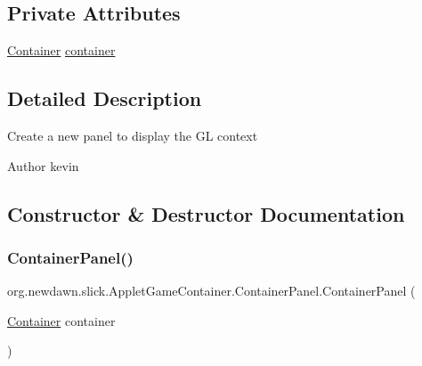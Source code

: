 \subsection*{Private Attributes}
\begin{DoxyCompactItemize}
\item 
\mbox{\hyperlink{classorg_1_1newdawn_1_1slick_1_1_applet_game_container_1_1_container}{Container}} \mbox{\hyperlink{classorg_1_1newdawn_1_1slick_1_1_applet_game_container_1_1_container_panel_a205433c30651024b8b0ba19894a080f6}{container}}
\end{DoxyCompactItemize}


\subsection{Detailed Description}
Create a new panel to display the GL context

\begin{DoxyAuthor}{Author}
kevin 
\end{DoxyAuthor}


\subsection{Constructor \& Destructor Documentation}
\mbox{\label{classorg_1_1newdawn_1_1slick_1_1_applet_game_container_1_1_container_panel_a71e98bdd07081b033755c98b0183c7f4}} 
\subsubsection{\texorpdfstring{Container\+Panel()}{ContainerPanel()}}
{\footnotesize\ttfamily org.\+newdawn.\+slick.\+Applet\+Game\+Container.\+Container\+Panel.\+Container\+Panel (\begin{DoxyParamCaption}\item[{\mbox{\hyperlink{classorg_1_1newdawn_1_1slick_1_1_applet_game_container_1_1_container}{Container}}}]{container }\end{DoxyParamCaption})\hspace{0.3cm}{\ttfamily [inline]}}

